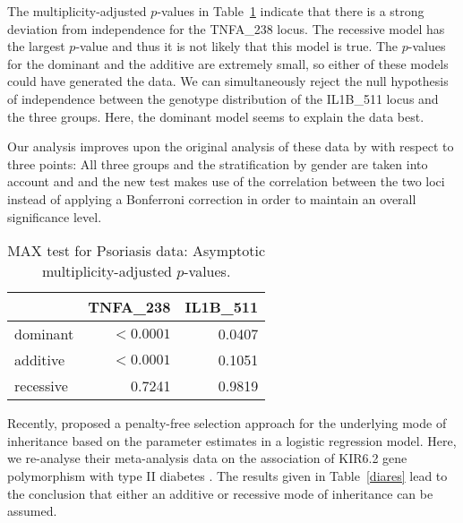 \documentclass[bimj,fleqn]{w-art}
\begin{document}
The multiplicity-adjusted $p$-values in Table~\ref{pstab} indicate that
there is a strong deviation from independence for the TNFA\_238 locus.
The recessive model has the largest $p$-value and thus it is not likely
that this model is true. The $p$-values for the dominant and the 
additive are extremely small, so either of these models could have generated 
the data. We can simultaneously reject the null hypothesis of independence
between the genotype distribution of the IL1B\_511 locus and the three groups.
Here, the dominant model seems to explain the data best. 

Our analysis improves upon the original analysis of these data by \citet{Reich:2002}
with respect to three points: All three groups and the stratification
by gender are taken into account and and the new test makes use of the
correlation between the two loci instead of applying a Bonferroni correction
in order to maintain an overall significance level.


\begin{table}
\begin{center}
\caption{MAX test for Psoriasis data: Asymptotic multiplicity-adjusted $p$-values. \label{pstab}}
\vspace*{0.5cm}
\begin{tabular}{lrr}
 & TNFA\_238 & IL1B\_511 \\ \hline
dominant  &  $< 0.0001$&0.0407 \\ 
additive  &  $< 0.0001$&0.1051 \\ 
recessive  &  0.7241&0.9819 \\ \hline
\end{tabular}
\end{center}
\end{table}

Recently, \citet{Bagos2007} proposed a penalty-free selection approach for the underlying mode of inheritance
based on the parameter estimates in a logistic regression model. Here, we re-analyse their meta-analysis 
data on the association of KIR6.2 gene polymorphism with type II diabetes 
\citep[Table~1 on page 3 in][]{Bagos2007}. The results given in Table~\ref{diares} lead to the
conclusion that either an additive or recessive mode of inheritance can be assumed.
\end{document}
